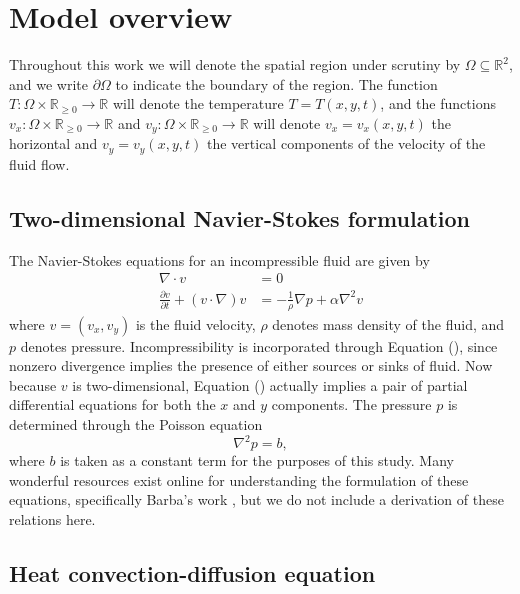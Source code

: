 \documentclass[12pt]{amsart}
\newcommand{\R}{\mathbb{R}}
\begin{document}
\section{Model overview}

Throughout this work we will denote the spatial region under scrutiny by
$\Omega \subseteq \R^2$, and we write $\partial \Omega$ to indicate the
boundary of the region. The function $T : \Omega \times \R_{\geq 0} \to \R$
will denote the temperature $T = T(x,y,t)$, and the functions $v_x : \Omega
\times \R_{\geq 0} \to \R$ and $v_y : \Omega \times \R_{\geq 0} \to \R$ will
denote $v_x = v_x(x,y,t)$ the horizontal and $v_y = v_y(x,y,t)$ the vertical
components of the velocity of the fluid flow. 

\subsection{Two-dimensional Navier-Stokes formulation}

The Navier-Stokes equations for an incompressible fluid are given by
\begin{align}
    \nabla \cdot v &= 0 \\
    \frac{\partial v}{\partial t} + (v \cdot \nabla) v &= -
    \frac{1}{\rho} \nabla p + \alpha \nabla^2 v
    \label{eq:\theequation}
\end{align}
where $v = (v_x, v_y)$ is the fluid velocity, $\rho$ denotes mass density of
the fluid, and $p$ denotes pressure. Incompressibility is incorporated
through Equation (), since nonzero divergence implies the presence of either
sources or sinks of fluid. Now because $v$ is two-dimensional, Equation
() actually implies a pair of partial differential equations for both the $x$
and $y$ components. The pressure $p$ is determined through the Poisson equation
\begin{equation}
    \nabla^2 p = b,
    \label{eq:\theequation}
\end{equation}
where $b$ is taken as a constant term for the purposes of this study. Many
wonderful resources exist online for understanding the formulation of these
equations, specifically Barba's work \cite{12-steps}, but we do not include a
derivation of these relations here.

\subsection{Heat convection-diffusion equation}
\end{document}
